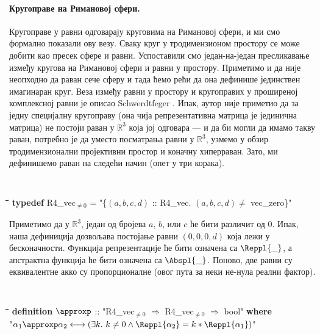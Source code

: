 \paragraph{Кругоправе на Римановој сфери.}
Кругоправе у равни одговарају круговима на Римановој сфери, и ми смо
формално показали ову везу. Сваку круг у тродимензионом простору се
може добити као пресек сфере и равни. Успоставили смо један-на-један
пресликавање између кругова на Римановој сфери и равни у
простору. Приметимо и да није неопходно да раван сече сферу и тада
ћемо рећи да она дефинише јединствен имагинаран круг. Веза између
равни у простору и кругоправих у проширеној комплексној равни је
описао Schwerdtfeger \cite{schwerdtfeger}. Ипак, аутор није приметио
да за једну специјалну кругоправу (она чија репрезентативна матрица је
јединична матрица) не постоји раван у $\mathbb{R}^3$ која јој одговара
--- и да би могли да имамо такву раван, потребно је да уместо
посматрања равни у $\mathbb{R}^3$, узмемо у обзир тродимензионални
пројективни простор и коначну хиперраван. Зато, ми дефинишемо раван на
следећи начин (опет у три корака).

{\tt
\begin{tabbing}
\hspace{5mm}\=\hspace{5mm}\=\hspace{5mm}\=\hspace{5mm}\=\hspace{5mm}\=\kill
{\bf typedef} R4\_vec$_{\neq 0}$ = "\{$(a, b, c, d)$ :: R4\_vec. $(a, b, c, d) \neq$ vec\_zero\}"
\end{tabbing}
}

Приметимо да у $\mathbb{R}^3$, један од бројева $a$, $b$, или $c$ ће
бити различит од $0$. Ипак, наша дефиниција дозвољава постојање равни
$(0, 0, 0, d)$ која лежи у бесконачности. Функција репрезентације ће
бити означена са $\Reppl{\_}$, а апстрактна функција ће бити означена
са $\Abspl{\_}$. Поново, две равни су еквивалентне акко су
пропорционалне (овог пута за неки не-нула реални фактор).  {\tt
\begin{tabbing}
\hspace{5mm}\=\hspace{5mm}\=\hspace{5mm}\=\hspace{5mm}\=\hspace{5mm}\=\kill
{\bf definition} $\approxp$ :: "R4\_vec$_{\neq 0}$ $\Rightarrow$ R4\_vec$_{\neq 0}$ $\Rightarrow$ bool" {\bf where}\\
\>"$\alpha_1 \approxp \alpha_2 \longleftrightarrow (\exists k.\ k \neq 0 \wedge \Reppl{\alpha_2} = k*\Reppl{\alpha_1})$"
\end{tabbing}
}

